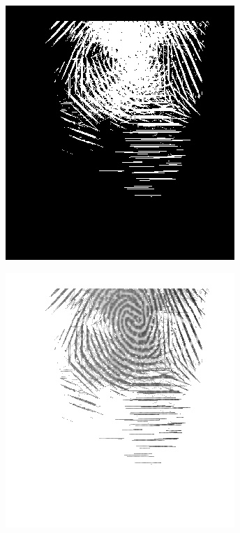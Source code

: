 \documentclass{beamer}
\begin{document}
{\begin{figure}[!ht]
\begin{subfigure}[ht]{0.15\textwidth}
        \end{subfigure}
        \qquad
        \begin{subfigure}[ht]{0.15\textwidth}
            \includegraphics[width=\textwidth]{fingerprints/2004Db2a/1_1_mask.jpg}
        \end{subfigure}
        \qquad
        \begin{subfigure}[ht]{0.15\textwidth}
            \includegraphics[width=\textwidth]{fingerprints/2004Db2a/1_1_filtered.jpg}

\end{subfigure}
\end{figure}}
\end{document}
